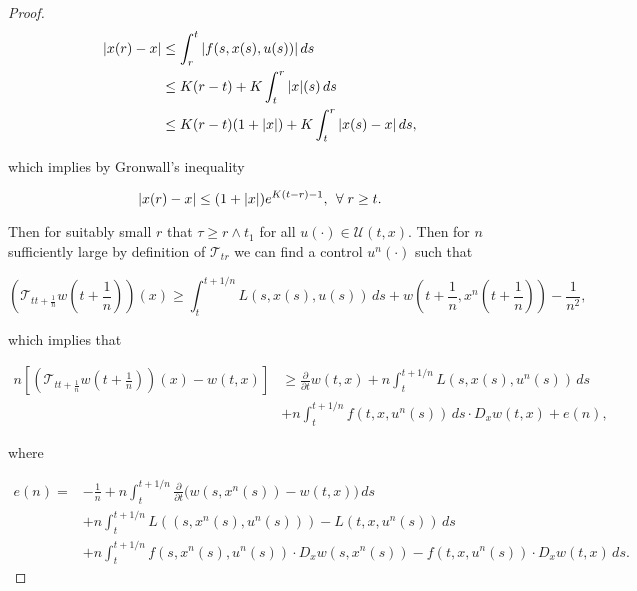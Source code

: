 \begin{proof}
    \begin{align*}
        \abs{x(r)-x} & \leq \int_r^t \abs{f(s,x(s),u(s))} \,ds \\
        & \leq K(r-t) + K\int_t^r \abs{x}(s)\,ds \\
        & \leq K(r-t)(1+\abs{x}) + K\int_t^r \abs{x(s)-x}\,ds,
    \end{align*}

    which implies by Gronwall's inequality 

    \[\abs{x(r)-x} \leq (1+\abs{x})e^{K(t-r)-1},\,\forall r\geq t.\]

    Then for suitably small $r$ that $\tau\geq r\wedge t_1$ for all $u(\cdot)\in\mathcal{U}(t,x)$. Then for $n$ sufficiently large by definition of $\mathcal{T}_{tr}$ we can find a control $u^n(\cdot)$ such that
    
    \begin{equation*}
        \left(\mathcal{T}_{tt+\frac{1}{n}}w\left(t+\frac{1}{n}\right)\right)(x) \geq \int_t^{t+1/n} L(s,x(s),u(s)) \,ds + w\left(t+\frac{1}{n},x^n\left(t+\frac{1}{n}\right)\right) - \frac{1}{n^2},
    \end{equation*}

    which implies that 

    \begin{equation}\label{4-1-inproof:geq}
        \begin{aligned}
            n\left[\left(\mathcal{T}_{tt+\frac{1}{n}}w\left(t+\frac{1}{n}\right)\right)(x) - w(t,x)\right] & \geq \frac{\partial}{\partial t}w(t,x) + n\int_t^{t+1/n} L(s,x(s),u^n(s))\,ds \\ 
            & + n\int_t^{t+1/n} f(t,x,u^n(s))\,ds \cdot D_xw(t,x) + e(n),
        \end{aligned}        
    \end{equation}
    
    where 

    \begin{equation}
        \begin{aligned}
            e(n) = & -\frac{1}{n} +n\int_t^{t+1/n} \frac{\partial}{\partial t}\big(w(s,x^n(s)) - w(t,x)\big)\,ds \\
            & + n\int_t^{t+1/n} L((s,x^n(s),u^n(s))) - L(t,x,u^n(s))\,ds \\
            & + n\int_t^{t+1/n} f(s,x^n(s),u^n(s))\cdot D_xw(s,x^n(s)) - f(t,x,u^n(s))\cdot D_xw(t,x) \,ds.
        \end{aligned}
    \end{equation}


\end{proof}
